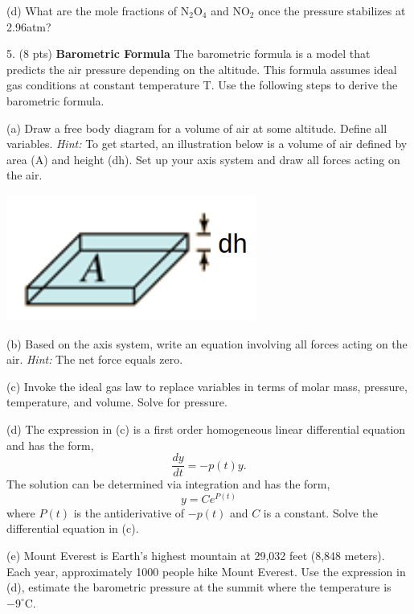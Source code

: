 \documentclass[11pt]{article}
\begin{document}
(d) What are the mole fractions of N$_2$O$_4$ and NO$_2$ once the pressure stabilizes at
2.96atm?

\pagebreak

5. (8 pts) \textbf{Barometric Formula} The barometric formula is a model that predicts the
air pressure depending on the altitude. This formula assumes ideal gas conditions at constant
temperature T. Use the following steps to derive the barometric formula.

(a) Draw a free body diagram for a volume of air at some altitude. Define all variables. \textit{Hint:}
To get started, an illustration below is a volume of air defined by area (A) and height (dh).
Set up your axis system and draw all forces acting on the air.
\begin{center}
  \includegraphics[scale=0.3]{air_vol.png}
\end{center}

(b) Based on the axis system, write an equation involving all forces acting on the air.
\textit{Hint:} The net force equals zero.

(c) Invoke the ideal gas law to replace variables in terms of molar mass, pressure,
temperature, and volume. Solve for pressure.

(d) The expression in (c) is a first order homogeneous linear differential equation and
has the form,
\begin{equation}
  \frac{dy}{dt} = -p(t)y.
\end{equation}
The solution can be determined via integration and has the form,
\begin{equation}
  y = Ce^{P(t)}
\end{equation}
where $P(t)$ is the antiderivative of $-p(t)$ and $C$ is a constant. Solve the differential
equation in (c).

(e) Mount Everest is Earth's highest mountain at 29,032 feet (8,848 meters). Each year,
approximately 1000 people hike Mount Everest. Use the expression in (d), estimate the
barometric pressure at the summit where the temperature is $-9^\circ\text{C}$.

\end{document}
